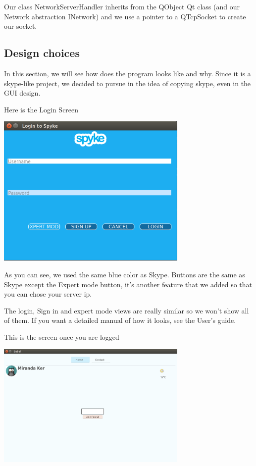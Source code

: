 \documentclass{article}
\begin{document}
  \bigskip

  Our class NetworkServerHandler inherits from the QObject Qt class (and our Network abstraction INetwork) and we use a pointer to a QTcpSocket to create our socket.

  \newpage

  \subsection{Design choices}

  In this section, we will see how does the program looks like and why.
  Since it is a skype-like project, we decided to pursue in the idea of copying skype, even in the GUI design.

  \bigskip
  Here is the Login Screen
  \bigskip

  \includegraphics[width=350]{loginScreen}

  \bigskip
  As you can see, we used the same blue color as Skype.
  Buttons are the same as Skype except the Expert mode button, it's another feature that we added so that you can chose your server ip.
  \newpage

  The login, Sign in and expert mode views are really similar so we won't show all of them. If you want a detailed manual of how it looks, see the User's guide.

  \bigskip
  This is the screen once you are logged
  \bigskip

  \includegraphics[width=350]{loggedScreen}
\end{document}
